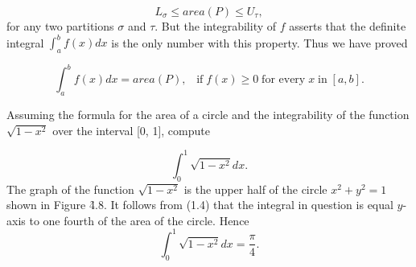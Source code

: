 $$
L_{\sigma}  \leq area(P) \leq U_{\tau},
$$
\noindent for any two partitions $\sigma$ and $\tau$. But the integrability of $f$ asserts that the definite integral $\int_{a}^{b} f(x) dx$ is the only number with this property. Thus we have proved

\begin{theorem} %
$$
\int_{a}^{b} f(x) dx = area(P),  \;\;\; \mbox{if}\; f(x) \geq 0\; \mbox{for every}\; x\; \mbox{in}\; [a,b].
$$
\end{theorem}
\medskip

\begin{example}
Assuming the formula for the area of a circle and the integrability of the function $\sqrt{1- x^2}$ over the interval [0, 1], compute
 
$$
\int_{0}^{1} \sqrt{1 - x^2} dx.
$$
\noindent The graph of the function $\sqrt{1 - x^2}$ is the upper half of the circle $x^2 + y^2 = 1$ shown in Figure \f{4.8}. It follows from (1.4) that the integral in question is equal $y$-axis to one fourth of the area of the circle. Hence
$$
\int_{0}^{1} \sqrt{1 - x^2} dx = \frac{\pi}{4}.
$$
\end{example}


